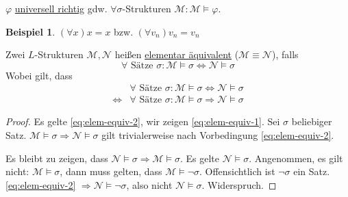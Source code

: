 \documentclass{article}
\theoremstyle{definition}
\newtheorem*{bsp}{Beispiel}
\theoremstyle{plain}
\newcommand{\m}[1]{\mathcal{#1}}
\begin{document}
    $ \varphi $ \underline{universell richtig} gdw. $ \forall \sigma$-Strukturen $ \m{M}: \m{M} \models \varphi $.
    \begin{bsp}
        $ (\forall x) x = x $ bzw. $ (\forall v_n) v_n = v_n $
    \end{bsp}

    Zwei $ L $-Strukturen $ \m{M}, \m{N} $ heißen \underline{elementar äquivalent} ($ \m{M} \equiv \m{N} $), falls
    \begin{equation*}
        \forall \text{ Sätze } \sigma: \m{M} \models \sigma \Leftrightarrow \m{N} \models \sigma
    \end{equation*}
    Wobei gilt, dass
    \begin{align}
        & \forall \text{ Sätze } \sigma: \m{M} \models \sigma \Leftrightarrow \m{N} \models \sigma \label{eq:elem-equiv-1} \\
        \Leftrightarrow & \forall \text{ Sätze } \sigma: \m{M} \models \sigma \Rightarrow \m{N} \models \sigma \label{eq:elem-equiv-2}
    \end{align}

    \begin{proof}
        Es gelte \eqref{eq:elem-equiv-2}, wir zeigen \eqref{eq:elem-equiv-1}.
        Sei $ \sigma $ beliebiger Satz.
        $ \m{M} \models \sigma \Rightarrow \m{N} \models \sigma $
        gilt trivialerweise nach Vorbedingung \eqref{eq:elem-equiv-2}.

        Es bleibt zu zeigen, dass $ \m{N} \models \sigma \Rightarrow \m{M} \models \sigma $.
        Es gelte $ \m{N} \models \sigma $.
        Angenommen, es gilt nicht: $ \m{M} \models \sigma $, dann muss gelten, dass $ \m{M} \models \neg \sigma $.
        Offensichtlich ist $ \neg \sigma $ ein Satz.
        \eqref{eq:elem-equiv-2} $ \Rightarrow \m{N} \models \neg \sigma $, also nicht $ \m{N} \models \sigma $. Widerspruch.
    \end{proof}
\end{document}
